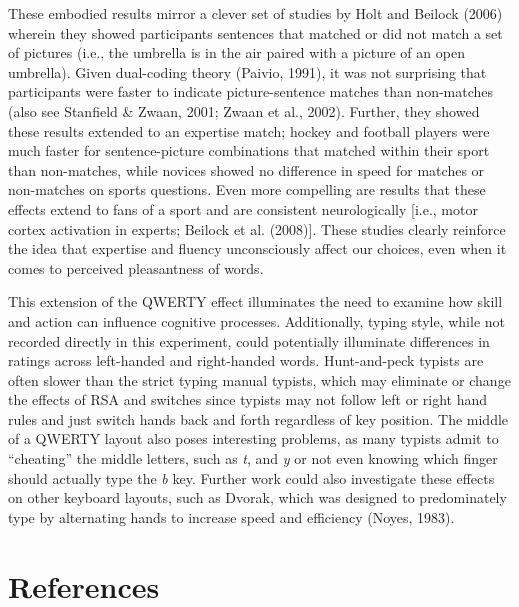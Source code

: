 \documentclass[
  english,
  man,mask]{apa7}
\begin{document}
These embodied results mirror a clever set of studies by Holt and Beilock (2006) wherein they showed participants sentences that matched or did not match a set of pictures (i.e., the umbrella is in the air paired with a picture of an open umbrella). Given dual-coding theory (Paivio, 1991), it was not surprising that participants were faster to indicate picture-sentence matches than non-matches (also see Stanfield \& Zwaan, 2001; Zwaan et al., 2002). Further, they showed these results extended to an expertise match; hockey and football players were much faster for sentence-picture combinations that matched within their sport than non-matches, while novices showed no difference in speed for matches or non-matches on sports questions. Even more compelling are results that these effects extend to fans of a sport and are consistent neurologically {[}i.e., motor cortex activation in experts; Beilock et al. (2008){]}. These studies clearly reinforce the idea that expertise and fluency unconsciously affect our choices, even when it comes to perceived pleasantness of words.

This extension of the QWERTY effect illuminates the need to examine how skill and action can influence cognitive processes. Additionally, typing style, while not recorded directly in this experiment, could potentially illuminate differences in ratings across left-handed and right-handed words. Hunt-and-peck typists are often slower than the strict typing manual typists, which may eliminate or change the effects of RSA and switches since typists may not follow left or right hand rules and just switch hands back and forth regardless of key position. The middle of a QWERTY layout also poses interesting problems, as many typists admit to ``cheating'' the middle letters, such as \emph{t}, and \emph{y} or not even knowing which finger should actually type the \emph{b} key. Further work could also investigate these effects on other keyboard layouts, such as Dvorak, which was designed to predominately type by alternating hands to increase speed and efficiency (Noyes, 1983).

\newpage

\hypertarget{references}{%
\section*{References}\label{references}}
\end{document}
